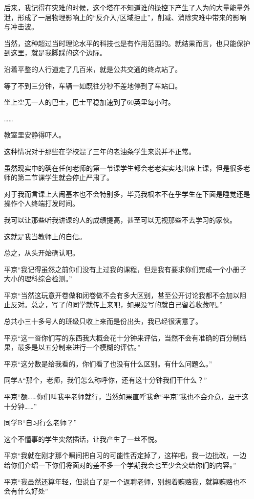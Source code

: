 后来，我记得在灾难的时候，这个塔在不知道谁的操控下产生了人为的大量能量外泄，形成了一层物理影响上的“反介入/区域拒止”，削减、消除灾难中带来的影响与冲击波。

当然，这种超过当时理论水平的科技也是有作用范围的。就结果而言，也只能保护到这里，就是我脚踩的这个边际。

沿着平整的人行道走了几百米，就是公共交通的终点站了。

等了不到三分钟，车辆一如既往分秒不差地停到了车站口。

坐上空无一人的巴士，巴士平稳加速到了60英里每小时。

……

教室里安静得吓人。

这种情况对于那些在学校混了三年的老油条学生来说并不正常。

虽然现实中的确在任何老师的第一节课学生都会老老实实地出席上课，但是很多老师的第二节课学生就会停止严肃了。

对于我而言课上大闹基本也不会特别多，毕竟我根本不在乎学生在下面是睡觉还是操作个人终端打发时间。


我可以让那些听我讲课的人的成绩提高，甚至可以无视那些不去学习的家伙。

这就是我当教师上的自信。

总之，从头开始确认吧。

平京“我记得虽然之前你们没有上过我的课程，但是我有要求你们完成一个小册子大小的理科综合检测。”

平京“当然这玩意开卷做和闭卷做不会有多大区别，甚至公开讨论我都不会加以阻止反对。总之，写了的同学就传上来吧，如果没写的就自己留着收藏吧。”

总共小三十多号人的班级只收上来而是份出头，我已经很满意了。

平京“这一沓你们写的东西我大概会花十分钟来评估，当然不会有准确的百分制结果，最多是以五分制来进行一个模糊的评估。”

平京“这分数是给我看的，你们看了也没有什么区别。有什么问题么。”

同学A“那个，老师，我们怎么称呼你，还有这十分钟我们干什么？”

平京“额……你们叫我平老师就行，当然如果直呼我命“平京”我也不会介意，至于这十分钟……”

同学B“自习行么老师？”

这个不懂事的学生突然插话，让我产生了一丝不悦。

平京“我就在刚才那个瞬间把自习的可能性否定掉了，这样吧，我一边批改，一边给你们介绍一下你们将面对的差不多一个学期我会也至少会交给你们的内容。”

平京“我虽然还算年轻，但说白了是一个返聘老师，别想着贿赂我，就算贿赂也不会有什么好处”

